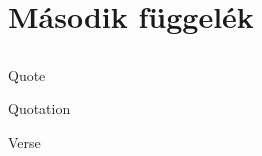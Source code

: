 \documentclass[twocolumn]{article}
\begin{document}
\section{Második függelék}
\subsection{}
\subsection{}
\clearpage
Quote
\begin{quote}
\lipsum[1-2]
\end{quote}

Quotation
\begin{quotation}
\lipsum[2-3]
\end{quotation}

Verse
\begin{verse}
\hulipsum[4-5]
\end{verse}
\end{document}
